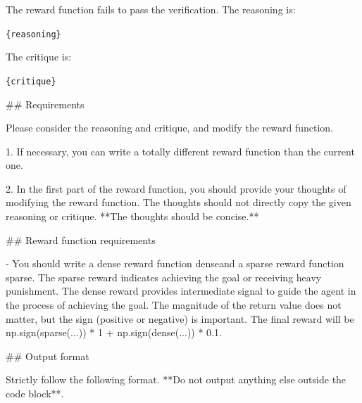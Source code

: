 

The reward function fails to pass the verification. The reasoning is: 

\textasciigrave \textasciigrave \textasciigrave 

\texttt{\{reasoning\}}

\textasciigrave \textasciigrave \textasciigrave 

The critique is:

\textasciigrave \textasciigrave \textasciigrave 

\texttt{\{critique\}}

\textasciigrave \textasciigrave \textasciigrave 



\#\# Requirements

Please consider the reasoning and critique, and modify the reward function. 

1. If necessary, you can write a totally different reward function than the current one.

2. In the first part of the reward function, you should provide your thoughts of modifying the reward function. The thoughts should not directly copy the given reasoning or critique. **The thoughts should be concise.**





\#\# Reward function requirements

- You should write a dense reward function \textasciigrave dense\textasciigrave  and a sparse reward function \textasciigrave sparse\textasciigrave . The sparse reward indicates achieving the goal or receiving heavy punishment. The dense reward provides intermediate signal to guide the agent in the process of achieving the goal. The magnitude of the return value does not matter, but the sign (positive or negative) is important. The final reward will be \textasciigrave np.sign(sparse(...)) * 1 + np.sign(dense(...)) * 0.1\textasciigrave .





\#\# Output format

Strictly follow the following format. **Do not output anything else outside the code block**.





